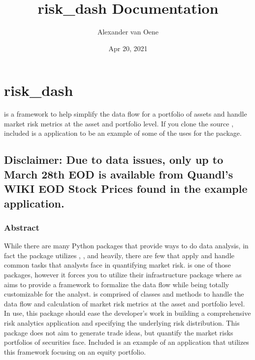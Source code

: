 \documentclass[letterpaper,10pt,english]{sphinxmanual}
\title{risk\_dash Documentation}
\date{Apr 20, 2021}
\author{Alexander van Oene}
\begin{document}
\pagestyle{empty}
\sphinxmaketitle
\pagestyle{plain}
\sphinxtableofcontents
\pagestyle{normal}
\label{\detokenize{index::doc}}



\chapter{risk\_dash}
\label{\detokenize{readme:risk-dash}}\label{\detokenize{readme::doc}}
\sphinxAtStartPar
{} is a framework to
help simplify the data flow for a portfolio of assets and handle market
risk metrics at the asset and portfolio level. If you clone the source
, included is a
 application to be an example of some of
the uses for the package.


\section{Disclaimer: Due to data issues, only up to March 28th EOD is available from Quandl’s WIKI EOD Stock Prices found in the example application.}
\label{\detokenize{readme:disclaimer-due-to-data-issues-only-up-to-march-28th-eod-is-available-from-quandls-wiki-eod-stock-prices-found-in-the-example-application}}

\subsection{Abstract}
\label{\detokenize{readme:abstract}}
\sphinxAtStartPar
While there are many Python packages that provide ways to do data
analysis, in fact the package utilizes
,
, and
 heavily, there are few that apply and
handle common tasks that analysts face in quantifying market risk.
 is one of those
packages, however it forces you to utilize their infrastructure package
 where as
 aims to provide a
framework to formalize the data flow while being totally customizable
for the analyst. 
is comprised of classes and methods to handle the data flow and
calculation of market risk metrics at the asset and portfolio level. In
use, this package should ease the developer’s work in building a
comprehensive risk analytics application and specifying the underlying
risk distribution. This package does not aim to generate trade ideas,
but quantify the market risks portfolios of securities face. Included is
an example of an application that utilizes this framework focusing on an
equity portfolio.
\end{document}
